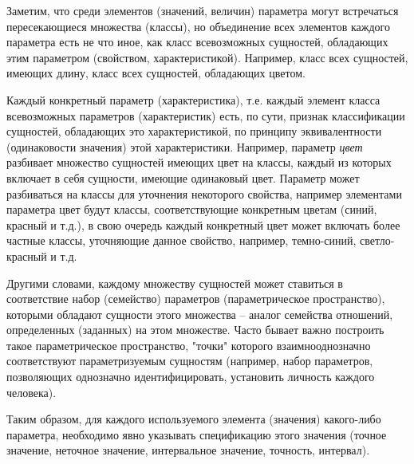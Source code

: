 \begin{SCn}
{Заметим, что среди элементов (значений, величин) параметра могут встречаться пересекающиеся множества (классы), но объединение всех элементов каждого параметра есть не что иное, как класс всевозможных сущностей, обладающих этим параметром (свойством, характеристикой). Например, класс всех сущностей, имеющих длину, класс всех сущностей, обладающих цветом.

Каждый конкретный параметр (характеристика), т.е. каждый элемент класса всевозможных параметров (характеристик) есть, по сути, признак классификации сущностей, обладающих это характеристикой, по принципу эквивалентности (одинаковости значения) этой характеристики. Например, параметр \textit{цвет} разбивает множество сущностей имеющих цвет на классы, каждый из которых включает в себя сущности, имеющие одинаковый цвет. Параметр может разбиваться на классы для уточнения некоторого свойства, например элементами параметра цвет будут классы, соответствующие конкретным цветам (синий, красный и т.д.), в свою очередь каждый конкретный цвет может включать более частные классы, уточняющие данное свойство, например, темно-синий, светло-красный и т.д.

Другими словами, каждому множеству сущностей может ставиться в соответствие набор (семейство) параметров (параметрическое пространство), которыми обладают сущности этого множества -- аналог семейства отношений, определенных (заданных) на этом множестве. Часто бывает важно построить такое параметрическое пространство, "точки"{} которого взаимнооднозначно соответствуют параметризуемым сущностям (например, набор параметров, позволяющих однозначно идентифицировать, установить личность каждого человека). 

Таким образом, для каждого используемого элемента (значения) какого-либо параметра, необходимо явно указывать спецификацию этого значения (точное значение, неточное значение, интервальное значение, точность, интервал).}




\end{SCn}
